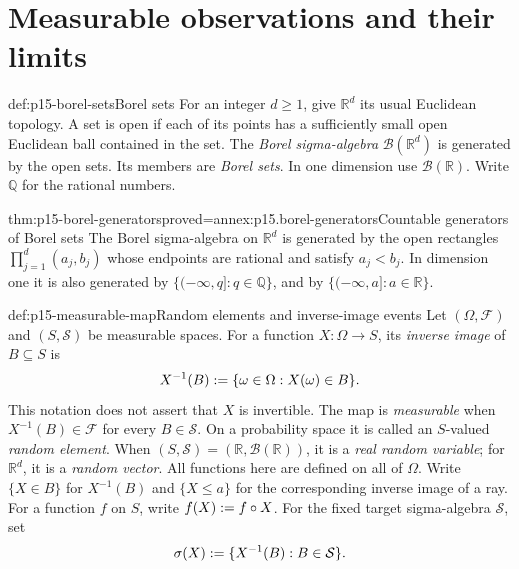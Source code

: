 \section{Measurable observations and their limits}
\label{sec:p15-measurable-observations}

\begin{hbdefinition}{def:p15-borel-sets}{Borel sets}
For an integer \(d\geq1\), give \(\mathbb R^d\) its usual Euclidean
topology. A set is open if each of its points has a sufficiently small
open Euclidean ball contained in the set. The \emph{Borel sigma-algebra}
\(\mathcal B(\mathbb R^d)\) is generated by the open sets. Its members
are \emph{Borel sets}. In one dimension use \(\mathcal B(\mathbb R)\).
Write \(\mathbb Q\) for the rational numbers.
\end{hbdefinition}

\begin{hbtheorem}{thm:p15-borel-generators}{proved=annex:p15.borel-generators}{Countable generators of Borel sets}
The Borel sigma-algebra on \(\mathbb R^d\) is generated by the open
rectangles \(\prod_{j=1}^d(a_j,b_j)\) whose endpoints are rational
and satisfy \(a_j<b_j\). In dimension one it is also generated by
\(\{(-\infty,q]:q\in\mathbb Q\}\), and by
\(\{(-\infty,a]:a\in\mathbb R\}\).
\end{hbtheorem}

\begin{hbdefinition}{def:p15-measurable-map}{Random elements and inverse-image events}
Let \((\Omega,\mathcal F)\) and \((S,\mathcal S)\) be measurable
spaces. For a function \(X:\Omega\to S\), its \emph{inverse image}
of \(B\subseteq S\) is
\[
 X^{-1}(B)\mathrel{:=}\{\omega\in\Omega:X(\omega)\in B\}.
\]
This notation does not assert that \(X\) is invertible. The map is
\emph{measurable} when \(X^{-1}(B)\in\mathcal F\) for every
\(B\in\mathcal S\). On a probability space it is called an
\(S\)-valued \emph{random element}. When
\((S,\mathcal S)=(\mathbb R,\mathcal B(\mathbb R))\), it is a
\emph{real random variable}; for \(\mathbb R^d\), it is a
\emph{random vector}. All functions here are defined on all of \(\Omega\).
Write \(\{X\in B\}\) for \(X^{-1}(B)\) and
\(\{X\leq a\}\) for the corresponding inverse image of a ray.
For a function \(f\) on \(S\), write \(f(X)\mathrel{:=} f\circ X\).
For the fixed target sigma-algebra \(\mathcal S\), set
\[
 \sigma(X)\mathrel{:=}\{X^{-1}(B):B\in\mathcal S\}.
\]
\end{hbdefinition}

